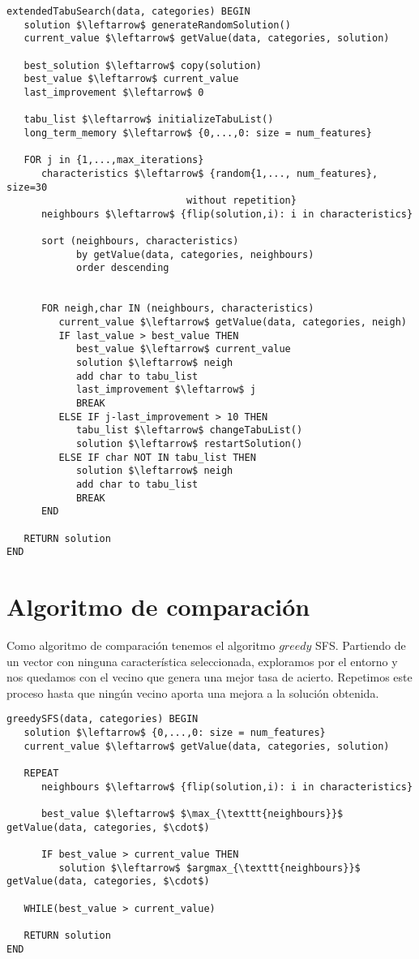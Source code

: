 \documentclass[11pt,leqno]{article}
\begin{document}
	\begin{lstlisting}[mathescape=true]
extendedTabuSearch(data, categories) BEGIN
   solution $\leftarrow$ generateRandomSolution()
   current_value $\leftarrow$ getValue(data, categories, solution)
   
   best_solution $\leftarrow$ copy(solution)
   best_value $\leftarrow$ current_value
   last_improvement $\leftarrow$ 0
   
   tabu_list $\leftarrow$ initializeTabuList()
   long_term_memory $\leftarrow$ {0,...,0: size = num_features}
	
   FOR j in {1,...,max_iterations}
      characteristics $\leftarrow$ {random{1,..., num_features}, size=30
                               without repetition}
      neighbours $\leftarrow$ {flip(solution,i): i in characteristics}
      
      sort (neighbours, characteristics) 
            by getValue(data, categories, neighbours) 
            order descending
      
	  
      FOR neigh,char IN (neighbours, characteristics)
         current_value $\leftarrow$ getValue(data, categories, neigh)
         IF last_value > best_value THEN
            best_value $\leftarrow$ current_value
            solution $\leftarrow$ neigh
            add char to tabu_list
            last_improvement $\leftarrow$ j
            BREAK
         ELSE IF j-last_improvement > 10 THEN
            tabu_list $\leftarrow$ changeTabuList()
            solution $\leftarrow$ restartSolution()
         ELSE IF char NOT IN tabu_list THEN
            solution $\leftarrow$ neigh
            add char to tabu_list
            BREAK
      END
      
   RETURN solution
END
	\end{lstlisting}


\section{Algoritmo de comparación}

Como algoritmo de comparación tenemos el algoritmo $\textit{greedy}$ SFS. Partiendo de un vector con ninguna característica seleccionada, exploramos por el entorno y nos quedamos con el vecino que genera una mejor tasa de acierto. Repetimos este proceso hasta que ningún vecino aporta una mejora a la solución obtenida.

	\begin{lstlisting}[mathescape=true]
greedySFS(data, categories) BEGIN
   solution $\leftarrow$ {0,...,0: size = num_features}
   current_value $\leftarrow$ getValue(data, categories, solution)
   
   REPEAT
      neighbours $\leftarrow$ {flip(solution,i): i in characteristics}
   
      best_value $\leftarrow$ $\max_{\texttt{neighbours}}$ getValue(data, categories, $\cdot$)
      
      IF best_value > current_value THEN
         solution $\leftarrow$ $argmax_{\texttt{neighbours}}$ getValue(data, categories, $\cdot$)
   
   WHILE(best_value > current_value)
   
   RETURN solution
END
	\end{lstlisting}
\end{document}
